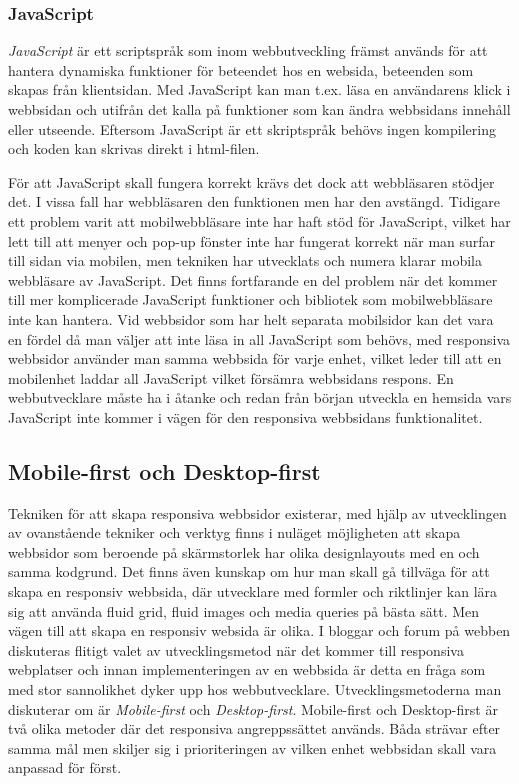 \documentclass[11pt]{article}
\begin{document}
\subsubsection{JavaScript}
\textit{JavaScript} är ett scriptspråk som inom webbutveckling främst används för att hantera dynamiska funktioner för beteendet hos en websida, beteenden som skapas från klientsidan. Med JavaScript kan man t.ex. läsa en användarens klick i webbsidan och utifrån det kalla på funktioner som kan ändra webbsidans innehåll eller utseende. Eftersom JavaScript är ett skriptspråk behövs ingen kompilering och koden kan skrivas direkt i html-filen.

För att JavaScript skall fungera korrekt krävs det dock att webbläsaren stödjer det. I vissa fall har webbläsaren den funktionen men har den avstängd. Tidigare ett problem varit att mobilwebbläsare inte har haft stöd för JavaScript, vilket har lett till att menyer och pop-up fönster inte har fungerat korrekt när man surfar till sidan via mobilen, men tekniken har utvecklats och numera klarar mobila webbläsare av JavaScript. Det finns fortfarande en del problem när det kommer till mer komplicerade JavaScript funktioner och bibliotek som mobilwebbläsare inte kan hantera. Vid webbsidor som har helt separata mobilsidor kan det vara en fördel då man väljer att inte läsa in all JavaScript som behövs, med responsiva webbsidor använder man samma webbsida för varje enhet, vilket leder till att en mobilenhet laddar all JavaScript vilket försämra webbsidans respons. En webbutvecklare måste ha i åtanke och redan från början utveckla en hemsida vars JavaScript inte kommer i vägen för den responsiva webbsidans funktionalitet.

\subsection{Mobile-first och Desktop-first}
Tekniken för att skapa responsiva webbsidor existerar, med hjälp av utvecklingen av ovanstående tekniker och verktyg finns i nuläget möjligheten att skapa webbsidor som beroende på skärmstorlek har olika designlayouts med en och samma kodgrund. Det finns även kunskap om hur man skall gå tillväga för att skapa en responsiv webbsida, där utvecklare med formler och riktlinjer kan lära sig att använda fluid grid, fluid images och media queries på bästa sätt. Men vägen till att skapa en responsiv websida är olika.  I bloggar och forum på webben diskuteras flitigt valet av utvecklingsmetod när det kommer till responsiva webplatser och innan implementeringen av en webbsida är detta en fråga som med stor sannolikhet dyker upp hos webbutvecklare. Utvecklingsmetoderna man diskuterar om är \textit{Mobile-first} och \textit{Desktop-first}. Mobile-first och Desktop-first är två olika metoder där det responsiva angreppssättet används. Båda strävar efter samma mål men skiljer sig i prioriteringen av vilken enhet webbsidan skall vara anpassad för först.
\end{document}
